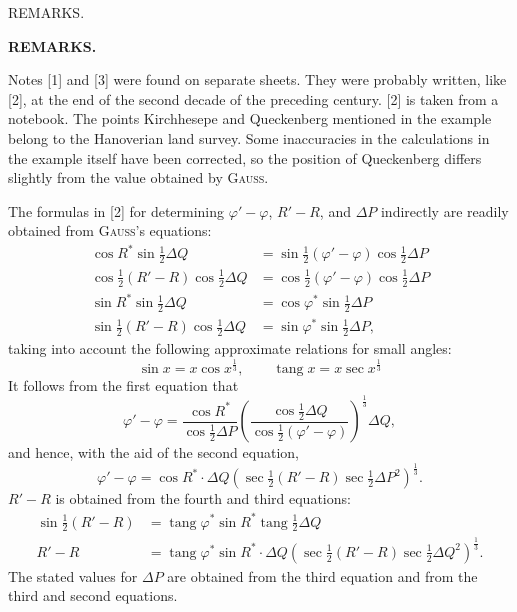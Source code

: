 \clearpage
{}\hfill REMARKS.\hfill\mbox{}\par
\vspace{12mm}
\begin{center}\textbf{REMARKS.}\end{center}
{\small
Notes [1] and [3] were found on separate sheets. They were probably written, like [2], at the end of the second decade of the preceding century. [2] is taken from a notebook. The points Kirchhesepe and Queckenberg mentioned in the example belong to the Hanoverian land survey. Some inaccuracies in the calculations in the example itself have been corrected, so the position of Queckenberg differs slightly from the value obtained by \textsc{Gauss}.

The formulas in [2] for determining $\varphi'-\varphi$, $R'-R$, and $\Delta P$ indirectly are readily obtained from \textsc{Gauss}'s equations:
\[
\begin{aligned}
\cos R^*\sin\tfrac12\Delta Q&=\sin\tfrac12(\varphi'-\varphi)\cos\tfrac12\Delta P\\
\cos\tfrac12(R'-R)\cos\tfrac12\Delta Q&=\cos\tfrac12(\varphi'-\varphi)\cos\tfrac12\Delta P\\
\sin R^*\sin\tfrac12\Delta Q&=\cos\varphi^*\sin\tfrac12\Delta P\\
\sin\tfrac12(R'-R)\cos\tfrac12\Delta Q&=\sin\varphi^*\sin\tfrac12\Delta P,
\end{aligned}
\]
taking into account the following approximate relations for small angles:
\[
\sin x=x\cos x^{\frac13},\qquad\operatorname{tang}x=x\sec x^{\frac13}
\]
It follows from the first equation that
\[
\varphi'-\varphi=\frac{\cos R^*}{\cos\tfrac12\Delta P}\left(\frac{\cos\tfrac12\Delta Q}{\cos\tfrac12(\varphi'-\varphi)}\right)^{\frac13}\Delta Q,
\]
and hence, with the aid of the second equation,
\[
\varphi'-\varphi=\cos R^*\cdot\Delta Q(\sec\tfrac12(R'-R)\sec\tfrac12\Delta P^2)^{\frac13}.
\]
$R'-R$ is obtained from the fourth and third equations:
\[
\begin{aligned}
\sin\tfrac12(R'-R)&=\operatorname{tang}\varphi^*\sin R^*\operatorname{tang}\tfrac12\Delta Q\\
R'-R&=\operatorname{tang}\varphi^*\sin R^*\cdot\Delta Q(\sec\tfrac12(R'-R)\sec\tfrac12\Delta Q^2)^{\frac13}.
\end{aligned}
\]
The stated values for $\Delta P$ are obtained from the third equation and from the third and second equations.

}
